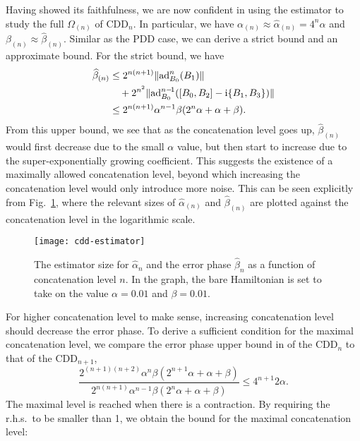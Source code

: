 \documentclass[aps,pra,reprint,superscriptaddress]{revtex4-2}
\begin{document}
Having showed its faithfulness, we are now confident in using the estimator  to study the full $\Omega_{(n)}$ of $\mathrm{CDD}_n$. In particular, we have $\alpha_{(n)}\approx\widehat\alpha_{(n)}=4^n \alpha$ and
$\beta_{(n)}\approx\widehat{\beta}_{(n)}$.
Similar as the PDD case, we can derive a strict bound and an approximate bound. For the strict bound, we have
\begin{equation}\label{eq:cdd-errph-bound1}
\begin{aligned}
\widehat{\beta}_{(n)} &\le   2^{n(n+1)}\Vert {\operatorname{ad}_{B_0}^{n}(B_1)} \Vert \\
&\quad + 2^{n^2} 
\Vert {\operatorname{ad}_{B_0}^{n-\!1}([B_0,B_2] - \mathrm{i}\{B_1,B_3\})} \Vert\\
&\le  2^{n(n+1)}\alpha^{n-1}\beta (2^n \alpha+ \alpha + \beta).
\end{aligned}
\end{equation}
From this upper bound,
we see that as the concatenation level goes up, $\widehat \beta_{(n)}$ would first decrease due to the small $\alpha$ value, but then start to increase 
due to the super-exponentially growing coefficient. This suggests the existence of a maximally allowed concatenation level, beyond which increasing the concatenation level would only introduce more noise. This can be seen explicitly from Fig.~\ref{fig:estimator-size}, where the relevant sizes of $\widehat \alpha_{(n)}$ and $\widehat \beta_{(n)}$ are plotted against the concatenation level in the logarithmic scale.
\begin{figure}[htbp]
    \centering
    \texttt{[image: cdd-estimator]}
    \caption{The estimator size for $\widehat \alpha_n$ and the error phase $\widehat \beta_n$ as a function of concatenation level $n$. In the graph, the bare Hamiltonian is set to take on the value $\alpha=0.01$ and $\beta=0.01$.}
    \label{fig:estimator-size}
\end{figure}
For higher concatenation level to make sense, increasing concatenation level should decrease the error phase. To derive a sufficient condition for the maximal concatenation level, we compare the error phase upper bound in  of the  $\mathrm{CDD}_n$ to that of the $\mathrm{CDD}_{n+1}$,
\begin{equation*}
\frac{2^{(n+1)(n+2)}\alpha^{n}\beta (2^{n+1} \alpha+ \alpha + \beta)}{2^{n(n+1)}\alpha^{n-1}\beta (2^n \alpha+ \alpha + \beta)} \le 4^{n+1}2\alpha.
\end{equation*}
The maximal level is reached when there is a contraction.
By requiring the r.h.s.\  to be smaller than 1, we obtain the bound for the maximal concatenation level:
\end{document}
